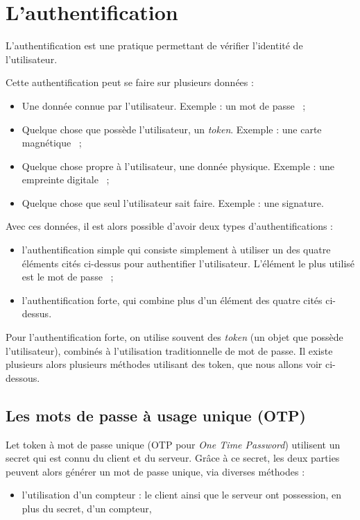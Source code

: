 \section{L'authentification}
L'authentification est une pratique permettant de vérifier
l'identité de l'utilisateur.

Cette authentification peut se faire sur plusieurs données : 
\begin{itemize}
  \item Une donnée connue par l'utilisateur. Exemple : un mot de
passe ~;
  \item Quelque chose que possède l'utilisateur, un \emph{token}.
Exemple : une carte magnétique ~;
  \item Quelque chose propre à l'utilisateur, une donnée physique.
Exemple : une empreinte digitale ~;
  \item Quelque chose que seul l'utilisateur sait faire. Exemple :
une signature.
\end{itemize}

Avec ces données, il est alors possible d'avoir deux types
d'authentifications : 
\begin{itemize}
  \item l'authentification simple qui consiste simplement à
utiliser un des quatre éléments cités ci-dessus pour authentifier
l'utilisateur. L'élément le plus utilisé est le mot de passe ~;
  \item l'authentification forte, qui combine plus d'un élément
des quatre cités ci-dessus.
\end{itemize}

Pour l'authentification forte, on utilise souvent des
\emph{token} (un objet que possède l'utilisateur), 
combinés à l'utilisation traditionnelle de mot de passe.
Il existe plusieurs alors plusieurs méthodes utilisant des token,
que nous allons voir ci-dessous.

\subsection{Les mots de passe à usage unique (OTP)}
Let token à mot de passe unique (OTP pour \emph{One Time
Password}) utilisent un secret qui est connu du client et du
serveur. Grâce à ce secret, les deux parties peuvent alors générer
un mot de passe unique, via diverses méthodes : 

\begin{itemize}
  \item l'utilisation d'un compteur : le client ainsi que le
serveur ont possession, en plus du secret, d'un compteur, 


\end{itemize}


